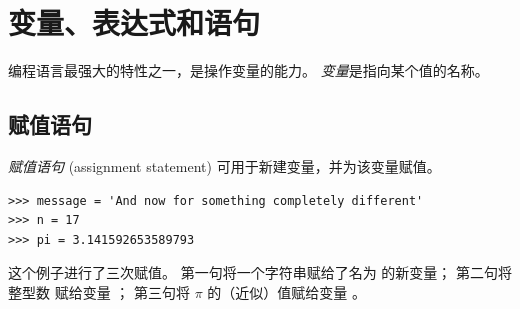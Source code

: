 


\chapter{变量、表达式和语句}


编程语言最强大的特性之一，是操作变量的能力。 {\em 变量}是指向某个值的名称。
  

\section{赋值语句}
\label{variables}
  
  


{\em 赋值语句} (assignment statement) 可用于新建变量，并为该变量赋值。

\begin{lstlisting}
>>> message = 'And now for something completely different'
>>> n = 17
>>> pi = 3.141592653589793
\end{lstlisting}
%

这个例子进行了三次赋值。 第一句将一个字符串赋给了名为  的新变量； 第二句将整型数  赋给变量 ； 第三句将 $\pi$ 的（近似）值赋给变量 。
  


